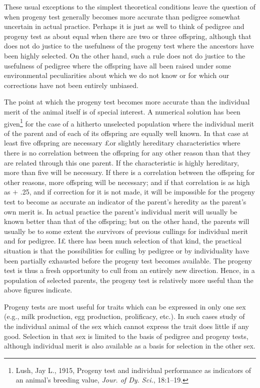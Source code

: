 These usual exceptions to the simplest theoretical conditions leave
the question of when progeny test generally becomes more accurate
than pedigree somewhat uncertain in actual practice. Perhaps it is just
as well to think of pedigree and progeny test as about equal when there
are two or three offspring, although that does not do justice to the usefulness
of the progeny test where the ancestors have been highly selected.
On the other hand, such a rule does not do justice to the usefulness
of pedigree where the offspring have all been raised under some environmental
peculiarities about which we do not know or for which our
corrections have not been entirely unbiased.

The point at which the progeny test becomes more accurate than
the individual merit of the animal itself is of special interest. A numerical
solution has been given\footnote{Lush, Jay L., 1915, Progeny test and individual
performance as indicators of an animal's breeding value, \textit{Jour. of Dy. Sci.},
18:1--19.} for the case of a hitherto unselected population
where the individual merit of the parent and of each of its
offspring are equally well known. In that case at least five offspring are
necessary £or slightly hereditary characteristics where there is no correlation
between the offspring for any other reason than that they are
related through this one parent. If the characteristic is highly hereditary,
more than five will be necessary. If there is a correlation between
the offspring for other reasons, more offspring will be necessary; and if
that correlation is as high as $+$ .25, and if correction for it is not made,
it will be impossible for the progeny test to become as accurate an indicator
of the parent's heredity as the parent's own merit is. In actual
practice the parent's individual merit will usually be known better than
that of the offspring; but on the other hand, the parents will usually be
to some extent the survivors of previous cullings for individual merit
and for pedigree. I£ there has been much selection of that kind, the
practical situation is that the possibilities for culling by pedigree or by
individuality have been partially exhausted before the progeny test
becomes available. The progeny test is thus a fresh opportunity to cull
from an entirely new direction. Hence, in a population of selected parents,
the progeny test is relatively more useful than the above figures
indicate.

Progeny tests are most useful for traits which can be expressed
in only one sex (e.g., milk production, egg production, prolificacy, etc.).
In such cases study of the individual animal of the sex which cannot
express the trait does little if any good. Selection in that sex is limited
to the basis of pedigree and progeny tests, although individual merit is
also available as a basis for selection in the other sex.

